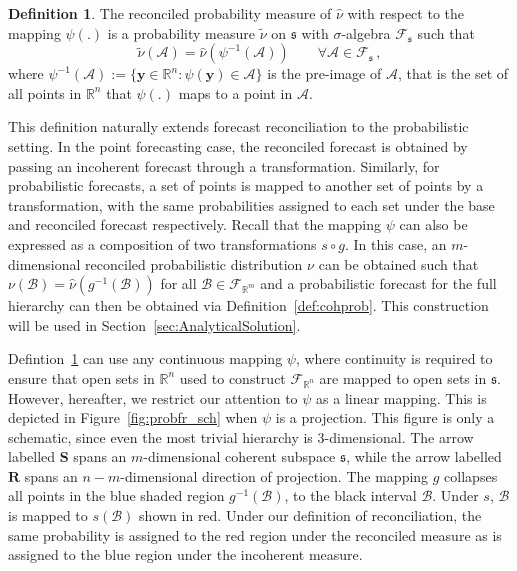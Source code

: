 \documentclass[12pt]{article}
\theoremstyle{definition}
\newtheorem{definition}{Definition}[section]
\begin{document}
\begin{definition} \label{def:reconprob}
	The reconciled probability measure of $\hat{\nu}$ with respect to the mapping $\psi(.)$ is a probability measure $\tilde{\nu}$ on $\mathfrak{s}$ with $\sigma$-algebra $\mathscr{F}_\mathfrak{s}$ such that
	\[
	\tilde{\nu}(\mathcal{A}) =  \hat{\nu}(\psi^{-1}(\mathcal{A})) \qquad \forall \mathcal{A} \in \mathscr{F}_{\mathfrak{s}}\,,
	\]
	where $\psi^{-1}(\mathcal{A}):=\{{\bm{y}}\in \mathbb{R}^n:\psi({\bm{y}})\in \mathcal{A}\}$ is the pre-image of $\mathcal{A}$, that is the set of all points in $\mathbb{R}^n$ that $\psi(.)$ maps to a point in $\mathcal{A}$.
\end{definition}

This definition naturally extends forecast reconciliation to the probabilistic setting. In the point forecasting case, the reconciled forecast is obtained by passing an incoherent forecast through a transformation. Similarly, for probabilistic forecasts, a set of points is mapped to another set of points by a transformation, with the same probabilities assigned to each set under the base and reconciled forecast respectively.  Recall that the mapping $\psi$ can also be expressed as a composition of two transformations $s\circ g$. In this case, an $m$-dimensional reconciled probabilistic distribution $\nu$ can be obtained such that $\nu(\mathcal{B})= \hat{\nu}(g^{-1}(\mathcal{B}))$ for all $\mathcal{B} \in \mathscr{F}_{\mathbb{R}^m}$ and a probabilistic forecast for the full hierarchy can then be obtained via Definition~\ref{def:cohprob}.  This construction will be used in Section~\ref{sec:AnalyticalSolution}.

Defintion~\ref{def:reconprob} can use any continuous mapping $\psi$, where continuity is required to ensure that open sets in $\mathbb{R}^n$ used to construct $\mathscr{F}_{\mathbb{R}^n}$ are mapped to open sets in $\mathfrak{s}$.  However, hereafter, we restrict our attention to $\psi$ as a linear mapping.  This is depicted in Figure~\ref{fig:probfr_sch} when $\psi$ is a projection.  This figure is only a schematic, since even the most trivial hierarchy is $3$-dimensional.  The arrow labelled $\bm{S}$ spans an $m$-dimensional coherent subspace $\mathfrak{s}$, while the arrow labelled $\bm{R}$ spans an $n-m$-dimensional direction of projection.  The mapping $g$ collapses all points in the blue shaded region $g^{-1}(\mathcal{B})$, to the black interval $\mathcal{B}$. Under $s$, $\mathcal{B}$ is mapped to $s(\mathcal{B})$ shown in red.  Under our definition of reconciliation, the same probability is assigned to the red region under the reconciled measure as is assigned to the blue region under the incoherent measure.
\end{document}
